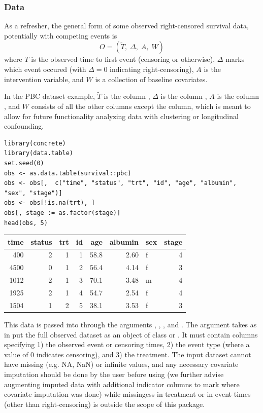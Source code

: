 \documentclass{report}
\newcommand{\1}{\ensuremath{\mathbf{1}}}
\newcommand{\T}{\ensuremath{\widetilde{T}}}
\renewcommand{\L}{\ensuremath{W}}
\begin{document}
\subsubsection{Data}
\label{ObservedDataConcrete}
As a refresher, the general form of some observed right-censored survival data, potentially with competing events is
\[ O = \left( \T ,\; \Delta ,\; A ,\; \L  \right) \]
where \(T\) is the observed time to first event (censoring or otherwise), \(\Delta\) marks which event occured (with \(\Delta = 0\) indicating right-censoring), \(A\) is the intervention variable, and \(\L\) is a collection of baseline covariates.

In the PBC dataset example, \(\T\) is the column , \(\Delta\) is the column , \(A\) is the column , and \(\L\) consists of all the other columns except the  column, which is meant to allow for future functionality analyzing data with clustering or longitudinal confounding. 

\begin{lstlisting}
library(concrete)
library(data.table)
set.seed(0)
obs <- as.data.table(survival::pbc)
obs <- obs[,  c("time", "status", "trt", "id", "age", "albumin", "sex", "stage")]
obs <- obs[!is.na(trt), ]
obs[, stage := as.factor(stage)]
head(obs, 5)
\end{lstlisting}

\begin{center}
\begin{tabular}{rrrrrrlr}
time & status & trt & id & age & albumin & sex & stage\\
\hline
400 & 2 & 1 & 1 & 58.8 & 2.60 & f & 4\\
4500 & 0 & 1 & 2 & 56.4 & 4.14 & f & 3\\
1012 & 2 & 1 & 3 & 70.1 & 3.48 & m & 4\\
1925 & 2 & 1 & 4 & 54.7 & 2.54 & f & 4\\
1504 & 1 & 2 & 5 & 38.1 & 3.53 & f & 3\\
\end{tabular}
\end{center}

This data is passed into  through the arguments , , , and . The  argument takes as in put the full observed dataset as an object of class  or . It must contain columns specifying 1) the observed event or censoring times, 2) the event type (where a value of 0 indicates censoring), and 3) the treatment. The input dataset cannot have missing (e.g. NA, NaN) or infinite values, and any necessary covariate imputation should be done by the user before using  (we further advise augmenting imputed data with additional indicator columns to mark where covariate imputation was done) while missingess in treatment or in event times (other than right-censoring) is outside the scope of this package.
\end{document}
